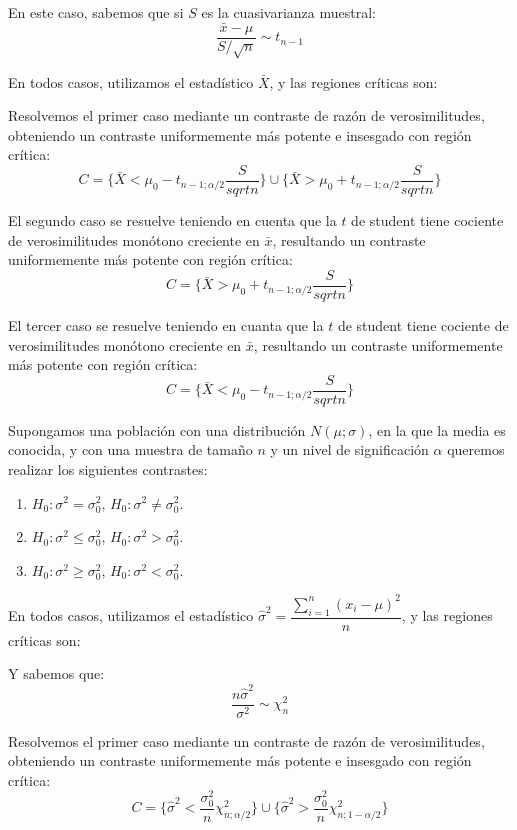 En este caso, sabemos que si $S$ es la cuasivarianza muestral:
\[\dfrac{\bar{x}-\mu}{S/\sqrt{n}}\sim t_{n-1}\]

En todos casos, utilizamos el estad\'istico $\bar{X}$, y las regiones cr\'iticas son:

Resolvemos el primer caso mediante un contraste de raz\'on de verosimilitudes, obteniendo un contraste uniformemente m\'as potente e insesgado con regi\'on cr\'itica:
\[C=\{\bar{X}<\mu_0-t_{n-1;\alpha/2}\dfrac{S}{sqrt{n}}\} \cup \{\bar{X}>\mu_0+t_{n-1;\alpha/2}\dfrac{S}{sqrt{n}}\}\]

El segundo caso se resuelve teniendo en cuenta que la $t$ de student tiene cociente de verosimilitudes mon\'otono creciente en $\bar{x}$, resultando un contraste uniformemente m\'as potente con regi\'on cr\'itica:
\[C= \{\bar{X}>\mu_0+t_{n-1;\alpha/2}\dfrac{S}{sqrt{n}}\}\]

El tercer caso se resuelve teniendo en cuanta que la $t$ de student tiene cociente de verosimilitudes mon\'otono creciente en $\bar{x}$, resultando un contraste uniformemente m\'as potente con regi\'on cr\'itica:
\[C= \{\bar{X}<\mu_0-t_{n-1;\alpha/2}\dfrac{S}{sqrt{n}}\}\]


Supongamos una poblaci\'on con una distribuci\'on $N(\mu;\sigma)$, en la que la media es conocida, y con una muestra de tama\~no $n$ y un nivel de significaci\'on $\alpha$ queremos realizar los siguientes contrastes:
\begin{enumerate}
\item $H_0:\sigma^2=\sigma^2_0$, $H_0:\sigma^2\neq\sigma^2_0$.
\item $H_0:\sigma^2\leq\sigma^2_0$, $H_0:\sigma^2>\sigma^2_0$.
\item $H_0:\sigma^2\geq\sigma^2_0$, $H_0:\sigma^2<\sigma^2_0$.
\end{enumerate}

En todos casos, utilizamos el estad\'istico $\hat{\sigma}^2=\dfrac{\sum_{i=1}^n(x_i-\mu)^2}{n}$, y las regiones cr\'iticas son:

Y sabemos que:
\[\dfrac{n\hat{\sigma}^2}{\sigma^2}\sim \chi^2_{n}\]

Resolvemos el primer caso mediante un contraste de raz\'on de verosimilitudes, obteniendo un contraste uniformemente m\'as potente e insesgado con regi\'on cr\'itica:
\[C=\{\hat{\sigma}^2<\dfrac{\sigma_0^2}{n}\chi^2_{n;\alpha/2}\} \cup \{\hat{\sigma}^2>\dfrac{\sigma_0^2}{n}\chi^2_{n;1-\alpha/2}\}\]

